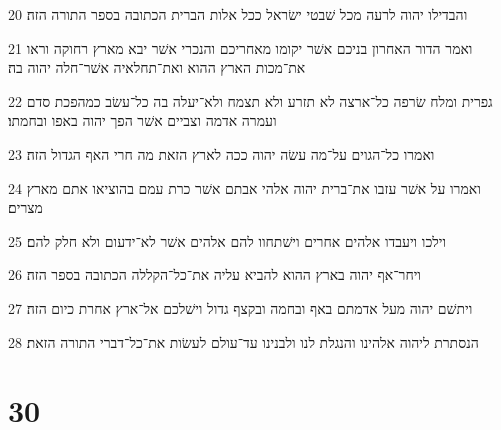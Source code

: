 \par 20 והבדילו יהוה לרעה מכל שׁבטי ישׂראל ככל אלות הברית הכתובה בספר התורה הזה׃
\par 21 ואמר הדור האחרון בניכם אשׁר יקומו מאחריכם והנכרי אשׁר יבא מארץ רחוקה וראו את־מכות הארץ ההוא ואת־תחלאיה אשׁר־חלה יהוה בה׃
\par 22 גפרית ומלח שׂרפה כל־ארצה לא תזרע ולא תצמח ולא־יעלה בה כל־עשׂב כמהפכת סדם ועמרה אדמה וצביים אשׁר הפך יהוה באפו ובחמתו׃
\par 23 ואמרו כל־הגוים על־מה עשׂה יהוה ככה לארץ הזאת מה חרי האף הגדול הזה׃
\par 24 ואמרו על אשׁר עזבו את־ברית יהוה אלהי אבתם אשׁר כרת עמם בהוציאו אתם מארץ מצרים׃
\par 25 וילכו ויעבדו אלהים אחרים וישׁתחוו להם אלהים אשׁר לא־ידעום ולא חלק להם׃
\par 26 ויחר־אף יהוה בארץ ההוא להביא עליה את־כל־הקללה הכתובה בספר הזה׃
\par 27 ויתשׁם יהוה מעל אדמתם באף ובחמה ובקצף גדול וישׁלכם אל־ארץ אחרת כיום הזה׃
\par 28 הנסתרת ליהוה אלהינו והנגלת לנו ולבנינו עד־עולם לעשׂות את־כל־דברי התורה הזאת׃

\chapter{30}

